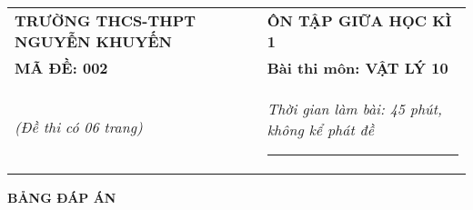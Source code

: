 \begin{center}
	\begin{tabular}{M{9.25cm}M{8.75cm}}
		\textbf{TRƯỜNG THCS-THPT NGUYỄN KHUYẾN}& \textbf{ÔN TẬP GIỮA HỌC KÌ 1}\\
		\textbf{MÃ ĐỀ: 002}& \textbf{Bài thi môn: VẬT LÝ 10}\\
		\textit{(Đề thi có 06 trang)}& \textit{Thời gian làm bài: 45 phút, không kể phát đề}
		
		\noindent\rule{4cm}{0.8pt} \\
	\end{tabular}
\end{center}
\setcounter{section}{0}
\begin{center}
	\textbf{\large BẢNG ĐÁP ÁN}
\end{center}
\section{}
\section{}
\section{}
